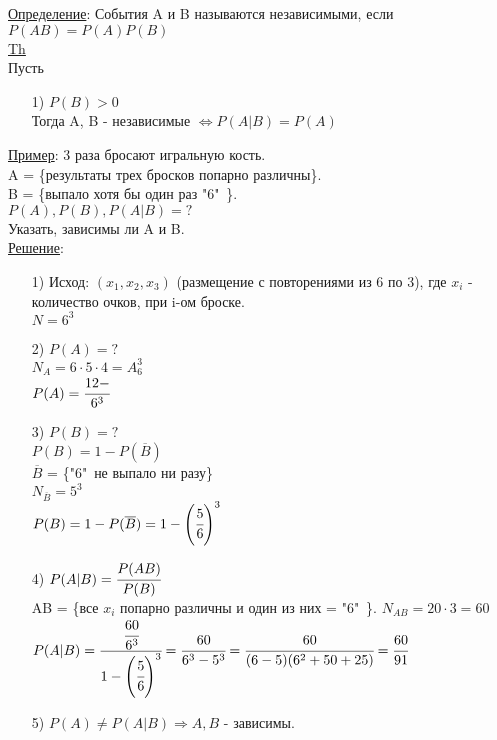 \underline{Определение}: События A и B называются независимыми, если $P(AB) = P(A)P(B)$ \\
\underline{Th} \\
Пусть \\
\begin{enumerate}
\item[1)] $P(B) > 0$ \\
Тогда A, B - независимые $\Leftrightarrow P(A|B) = P(A)$ \\
\end{enumerate}
\underline{Пример}: 3 раза бросают игральную кость. \\
A = \{результаты трех бросков попарно различны\}. \\
B = \{выпало хотя бы один раз "6"\ \}. \\
$P(A), P(B), P(A|B) = ?$ \\
Указать, зависимы ли A и B. \\
\underline{Решение}: 
\begin{enumerate}
\item[1)] Исход: $(x_1, x_2, x_3)$ (размещение с повторениями из 6 по 3), где $x_i$ - количество очков, при i-ом броске. \\
$N = 6^3$ \\

\item[2)] 
$P(A) = ?$ \\
$N_A = 6 \cdot 5 \cdot 4 = A^3_6$ \\
$P(A) = \cfrac{12-}{6^3}$ \\

\item[3)] $P(B) = ?$ \\
$P(B) = 1 - P(\overline{B})$ \\
$\overline{B}$ = \{"6"\ не выпало ни разу\} \\
$N_{\overline{B}} = 5^3$ \\
$P(B) = 1 -P(\overline{B}) = 1 - \left( \cfrac{5}{6} \right)^3$ \\

\item[4)] $P(A|B) = \cfrac{P(AB)}{P(B)}$ \\
AB = \{все $x_i$ попарно различны и один из них = "6"\ \}.
$N_{AB} = 20 \cdot 3 = 60$ \\
$P(A|B) = \cfrac{\cfrac{60}{6^3}}{1 - \left( \cfrac{5}{6} \right)^3} = \cfrac{60}{6^3 - 5^3} = \cfrac{60}{(6 - 5)(6^2 + 50 + 25)} = \cfrac{60}{91}$ \\

\item[5)] $P(A) \neq P(A|B) \Rightarrow A,B$ - зависимы.
\end{enumerate}

